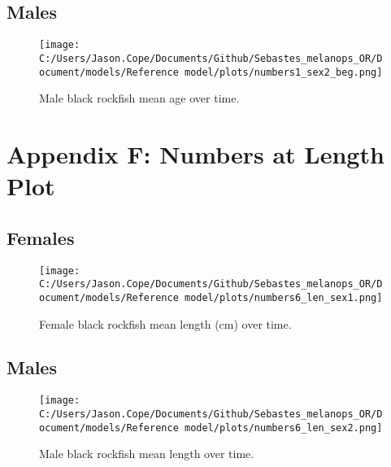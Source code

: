 \documentclass[11pt,
  english,
  letterpaper,
]{article}
\begin{document}
\hypertarget{males}{%
\subsection{Males}\label{males}}

\begin{figure}
\centering
\texttt{[image: C:/Users/Jason.Cope/Documents/Github/Sebastes\_melanops\_OR/Document/models/Reference model/plots/numbers1\_sex2\_beg.png]}
\caption{Male black rockfish mean age over time.\label{fig:num_age_males}}
\end{figure}

\clearpage

\hypertarget{app-f}{%
\section{Appendix F: Numbers at Length Plot}\label{app-f}}

\hypertarget{females-1}{%
\subsection{Females}\label{females-1}}

\begin{figure}
\centering
\texttt{[image: C:/Users/Jason.Cope/Documents/Github/Sebastes\_melanops\_OR/Document/models/Reference model/plots/numbers6\_len\_sex1.png]}
\caption{Female black rockfish mean length (cm) over time.\label{fig:num_lts_females}}
\end{figure}

\clearpage

\hypertarget{males-1}{%
\subsection{Males}\label{males-1}}

\begin{figure}
\centering
\texttt{[image: C:/Users/Jason.Cope/Documents/Github/Sebastes\_melanops\_OR/Document/models/Reference model/plots/numbers6\_len\_sex2.png]}
\caption{Male black rockfish mean length over time.\label{fig:num_lts_males}}
\end{figure}

\clearpage
\end{document}
